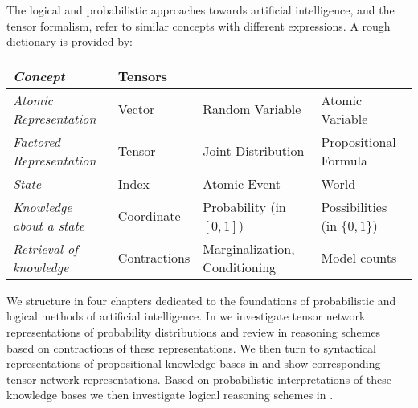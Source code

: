 The logical and probabilistic approaches towards artificial intelligence, and the tensor formalism, refer to similar concepts with different expressions. %
A rough dictionary is provided by:
\begin{center}
    \begin{tabular}{|p{\threecolumnwidth}|p{\fourcolumnwidth}|p{\fourcolumnwidth}|p{\fourcolumnwidth}|} %
        \hline
        \textit{Concept}                 & \textbf{Tensors} & \textbf{\ProbabilityTheory{}} & \textbf{\PropositionalLogic{}} \\
        \hline
        \textit{Atomic Representation}   & Vector           & Random Variable               & Atomic Variable                \\
        \textit{Factored Representation} & Tensor           & Joint Distribution            & Propositional Formula          \\
        \textit{State}                   & Index            & Atomic Event                  & World                          \\
        \textit{Knowledge about a state} & Coordinate       & Probability (in $[0,1]$)      & Possibilities (in $\{0,1\}$)   \\
        \textit{Retrieval of knowledge}  & Contractions     & Marginalization, Conditioning & Model counts                   \\
        \hline
    \end{tabular}
\end{center}



We structure  in four chapters dedicated to the foundations of probabilistic and logical methods of artificial intelligence.
In  we investigate tensor network representations of probability distributions and review in  reasoning schemes based on contractions of these representations.
We then turn to syntactical representations of propositional knowledge bases in  and show corresponding tensor network representations.
Based on probabilistic interpretations of these knowledge bases we then investigate logical reasoning schemes in .
